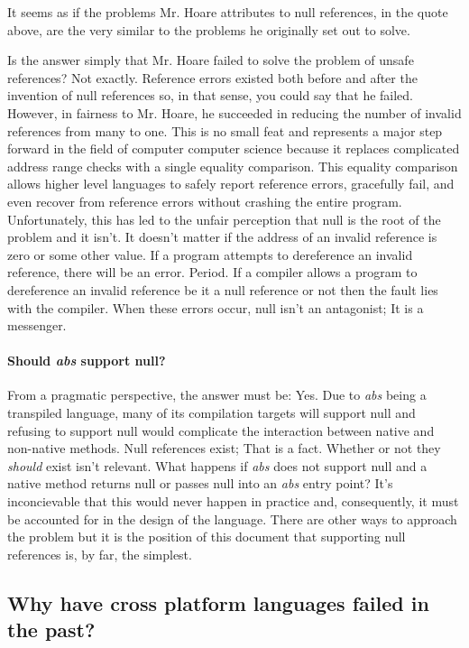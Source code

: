 \documentclass[hidelinks]{article}
\begin{document}
It seems as if the problems Mr. Hoare attributes to null references, in the quote above, are the very similar to the problems he originally set out to solve. 

Is the answer simply that Mr. Hoare failed to solve the problem of unsafe references? Not exactly. Reference errors existed both before and after the invention of null references so, in that sense, you could say that he failed. However, in fairness to Mr. Hoare, he succeeded in reducing the number of invalid references from many to one. This is no small feat and represents a major step forward in the field of computer computer science because it replaces complicated address range checks with a single equality comparison. This equality comparison allows higher level languages to safely report reference errors, gracefully fail, and even recover from reference errors without crashing the entire program. Unfortunately, this has led to the unfair perception that null is the root of the problem and it isn't. It doesn't matter if the address of an invalid reference is zero or some other value. If a program attempts to dereference an invalid reference, there will be an error. Period. If a compiler allows a program to dereference an invalid reference be it a null reference or not then the fault lies with the compiler. When these errors occur, null isn't an antagonist; It is a messenger.

\paragraph{Should \textit{abs} support null?}From a pragmatic perspective, the answer must be: Yes. Due to \textit{abs} being a transpiled language, many of its compilation targets will support null and refusing to support null would complicate the interaction between native and non-native methods. Null references exist; That is a fact. Whether or not they \textit{should} exist isn't relevant. What happens if \textit{abs} does not support null and a native method returns null or passes null into an \textit{abs} entry point? It's inconcievable that this would never happen in practice and, consequently, it must be accounted for in the design of the language. There are other ways to approach the problem but it is the position of this document that supporting null references is, by far, the simplest.

\subsection{Why have cross platform languages failed in the past?}
\end{document}

